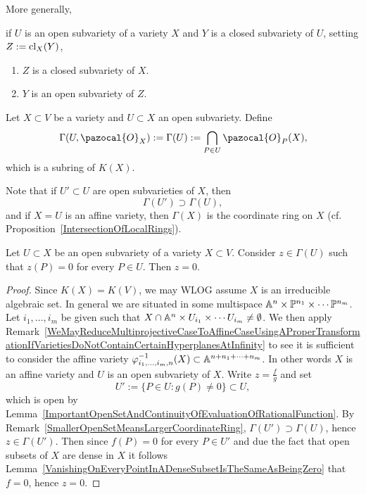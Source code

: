     More generally,
    \begin{lemma}\label{ClosureOfClosedSubvarietyIsClosedSubvariety}
        if $U$ is an open subvariety of a variety $X$ and $Y$ is a closed subvariety of $U$, setting $Z:= \mathrm{cl}_X(Y)$,
        \begin{enumerate}
            \item $Z$ is a closed subvariety of $X$.
            \item $Y$ is an open subvariety of $Z$.
        \end{enumerate} 
    \end{lemma}
    \begin{definition}
        Let $X\subset V$ be a variety and $U\subset X$ an open subvariety. Define 
        $$\Gamma(U,\pazocal{O}_X):= \Gamma(U):= \bigcap_{P\in U} \pazocal{O}_P(X),$$
        which is a subring of $K(X)$.
    \end{definition}
    \begin{remark}\label{SmallerOpenSetMeansLargerCoordinateRing}
        Note that if $U'\subset U$ are open subvarieties of $X$, then 
        $$\Gamma(U')\supset \Gamma(U),$$
        and if $X=U$ is an affine variety, then $\Gamma(X)$ is the coordinate ring on $X$ (cf. Proposition~\ref{IntersectionOfLocalRings}). 
    \end{remark}
    \begin{proposition}
        Let $U\subset X$ be an open subvariety of a variety $X\subset V$. Consider $z\in \Gamma(U)$ such that $z(P) =0$ for every $P\in U$. Then $z=0$.
    \end{proposition}
    \begin{proof}
        Since $K(X)=K(V)$, we may WLOG assume $X$ is an irreducible algebraic set. In general we are situated in some multispace $\mathbb{A}^n\times \mathbb{P}^{n_1}\times \cdots \mathbb{P}^{n_m}$. Let $i_1,\dots,i_m$ be given such that $X\cap \mathbb{A}^n\times U_{i_1}\times\cdots U_{i_m} \neq \emptyset$. We then apply Remark~\ref{WeMayReduceMultiprojectiveCaseToAffineCaseUsingAProperTransformationIfVarietiesDoNotContainCertainHyperplanesAtInfinity} to see it is sufficient to consider the affine variety $\varphi_{i_1,\dots,i_m,n}^{-1}(X)\subset \mathbb{A}^{n+n_1+\dots+n_m}$. In other words $X$ is an affine variety and $U$ is an open subvariety of $X$. Write $z=\frac{f}{g}$ and set 
        $$
            U':=\{ P\in U: g(P)\neq 0\}\subset U, 
        $$ which is open by Lemma~\ref{ImportantOpenSetAndContinuityOfEvaluationOfRationalFunction}. By Remark~\ref{SmallerOpenSetMeansLargerCoordinateRing}, $\Gamma(U')\supset \Gamma(U)$, hence $z\in \Gamma(U')$. Then since $f(P)=0$ for every $P\in U'$ and due the fact that open subsets of $X$ are dense in $X$ it follows Lemma~\ref{VanishingOnEveryPointInADenseSubsetIsTheSameAsBeingZero} that $f=0$, hence $z=0$.
    \end{proof}
